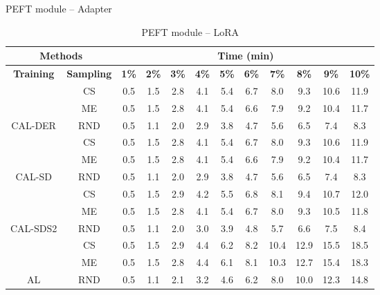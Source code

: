 \begin{table}[htbp]
\centering
\begin{subtable}{\linewidth}
\centering
\caption{PEFT module -- Adapter}

\begin{tabular}{c|c|cccccccccc}
\toprule
\multicolumn{2}{c|}{\textbf{Methods}} & \multicolumn{10}{c}{\textbf{Time (min)}} \\
\midrule
\textbf{Training} & \textbf{Sampling} & \textbf{1\%} & \textbf{2\%} & \textbf{3\%} & \textbf{4\%} & \textbf{5\%} & \textbf{6\%} & \textbf{7\%} & \textbf{8\%} & \textbf{9\%} & \textbf{10\%}\\
\midrule
 & CS & 0.5 & 1.5 & 2.8 & 4.1 & 5.4 & 6.7 & 8.0 & 9.3 & 10.6 & 11.9\\

 & ME & 0.5 & 1.5 & 2.8 & 4.1 & 5.4 & 6.6 & 7.9 & 9.2 & 10.4 & 11.7\\

\multirow{-3}{*}{\raggedright\arraybackslash CAL-DER} & RND & 0.5 & 1.1 & 2.0 & 2.9 & 3.8 & 4.7 & 5.6 & 6.5 & 7.4 & 8.3\\
\midrule
 & CS & 0.5 & 1.5 & 2.8 & 4.1 & 5.4 & 6.7 & 8.0 & 9.3 & 10.6 & 11.9\\

 & ME & 0.5 & 1.5 & 2.8 & 4.1 & 5.4 & 6.6 & 7.9 & 9.2 & 10.4 & 11.7\\

\multirow{-3}{*}{\raggedright\arraybackslash CAL-SD} & RND & 0.5 & 1.1 & 2.0 & 2.9 & 3.8 & 4.7 & 5.6 & 6.5 & 7.4 & 8.3\\
\midrule
 & CS & 0.5 & 1.5 & 2.9 & 4.2 & 5.5 & 6.8 & 8.1 & 9.4 & 10.7 & 12.0\\

 & ME & 0.5 & 1.5 & 2.8 & 4.1 & 5.4 & 6.7 & 8.0 & 9.3 & 10.5 & 11.8\\

\multirow{-3}{*}{\raggedright\arraybackslash CAL-SDS2} & RND & 0.5 & 1.1 & 2.0 & 3.0 & 3.9 & 4.8 & 5.7 & 6.6 & 7.5 & 8.4\\
\midrule
 & CS & 0.5 & 1.5 & 2.9 & 4.4 & 6.2 & 8.2 & 10.4 & 12.9 & 15.5 & 18.5\\

 & ME & 0.5 & 1.5 & 2.8 & 4.4 & 6.1 & 8.1 & 10.3 & 12.7 & 15.4 & 18.3\\

\multirow{-3}{*}{\raggedright\arraybackslash AL} & RND & 0.5 & 1.1 & 2.1 & 3.2 & 4.6 & 6.2 & 8.0 & 10.0 & 12.3 & 14.8\\
\bottomrule
\end{tabular}
\end{subtable}
\vspace{1em}
\begin{subtable}{\linewidth}
\centering
\caption{PEFT module -- LoRA}


\end{subtable}
\end{table}
